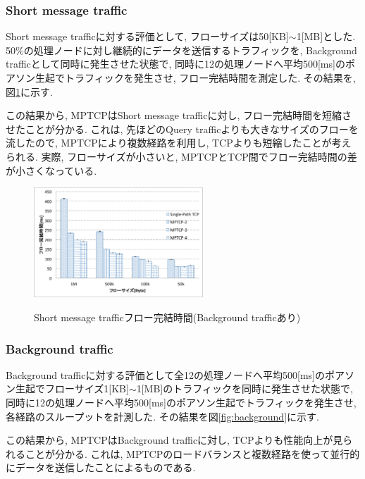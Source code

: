 \documentclass[technicalreport]{ieicej}
\begin{document}
\subsubsection{Short message traffic}
Short message trafficに対する評価として, フローサイズは50[KB]$\sim$1[MB]とした.
50\%の処理ノードに対し継続的にデータを送信するトラフィックを, Background trafficとして同時に発生させた状態で,
同時に12の処理ノードへ平均500[ms]のポアソン生起でトラフィックを発生させ, フロー完結時間を測定した.
その結果を, 図\ref{fig:short_query}に示す.

この結果から, MPTCPはShort message trafficに対し, フロー完結時間を短縮させたことが分かる.
これは, 先ほどのQuery trafficよりも大きなサイズのフローを流したので, MPTCPにより複数経路を利用し, TCPよりも短縮したことが考えられる.
実際, フローサイズが小さいと, MPTCPとTCP間でフロー完結時間の差が小さくなっている.

\begin{figure}[h]
    \begin{center}
    \includegraphics[autoebb, width=180pt]{./img/mix_short.pdf}
    \caption{Short message trafficフロー完結時間(Background trafficあり)}
    \label{fig:short_query}
    \end{center}
\end{figure}


\subsubsection{Background traffic}
Background
trafficに対する評価として全12の処理ノードへ平均500[ms]のポアソン生起でフローサイズ1[KB]$\sim$1[MB]のトラフィックを同時に発生させた状態で,
同時に12の処理ノードへ平均500[ms]のポアソン生起でトラフィックを発生させ, 各経路のスループットを計測した.
その結果を図\ref{fig:background}に示す.

この結果から, MPTCPはBackground trafficに対し, TCPよりも性能向上が見られることが分かる.
これは, MPTCPのロードバランスと複数経路を使って並行的にデータを送信したことによるものである.
\end{document}
